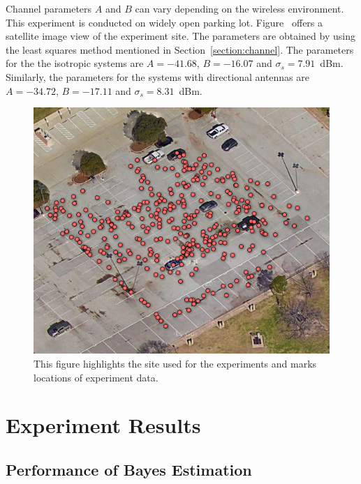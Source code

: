 Channel parameters $A$ and $B$ can vary depending on the wireless environment.
This experiment is conducted on widely open parking lot.
Figure~\label{figure:Googlemap} offers a satellite image view of the experiment site.
The parameters are obtained by using the least squares method mentioned in Section~\ref{section:channel}.
The parameters for the the isotropic systems are $A = -41.68$, $B = -16.07$ and $\sigma_{s} = 7.91$~dBm.
Similarly, the parameters for the systems with directional antennas are $A = -34.72$, $B = -17.11$ and $\sigma_{s} = 8.31$~dBm.
\begin{figure}[]
	\centering
	\includegraphics[scale=1]{Figures/Googlemap.png}
	\caption{This figure highlights the site used for the experiments and marks locations of experiment data. }
	\label{figure:Googlemap}
\end{figure}


\section{Experiment Results}
\subsection{Performance of Bayes Estimation}

